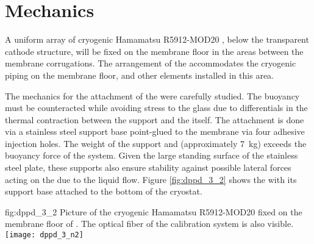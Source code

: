 \section{Mechanics}
\label{sec:dp-pds-mechanics}


A uniform array of \dpnumpmtch cryogenic Hamamatsu R5912-MOD20 , below the transparent cathode structure, will be fixed on the membrane floor in the areas between the membrane corrugations. The arrangement of the  accommodates the cryogenic piping on the membrane floor, and other elements installed in this area.

The mechanics for the attachment of the  were carefully studied. The  buoyancy must be counteracted while avoiding stress to the  glass due to differentials in the thermal contraction between the support and the  itself. The attachment is done via a stainless steel support base point-glued to the membrane via four adhesive injection holes. The weight of the support and  (approximately \SI{7}{\kg}) exceeds the buoyancy force of the system. Given the large standing surface of the stainless steel plate, these supports also ensure stability against possible lateral forces acting on the  due to the liquid flow. Figure \ref{fig:dppd_3_2} shows the  with its support base attached to the bottom of the  cryostat.


\begin{dunefigure}{fig:dppd_3_2}
{Picture of the cryogenic Hamamatsu R5912-MOD20  fixed on the membrane floor of . The optical fiber of the calibration system is also visible.}
\texttt{[image: dppd\_3\_n2]}
\end{dunefigure}


